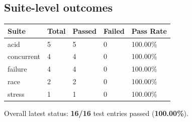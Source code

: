 \documentclass[a4paper, 11pt]{article}
\begin{document}
\subsection{Suite-level outcomes}
\renewcommand{\arraystretch}{1.3}
\begin{tabular}{|p{3.2cm}|p{2.0cm}|p{2.0cm}|p{2.0cm}|p{3.8cm}|}
\hline
\rowcolor{HeaderGray}
\textbf{Suite} & \textbf{Total} & \textbf{Passed} & \textbf{Failed} & \textbf{Pass Rate} \\ \hline
acid & 5 & 5 & 0 & 100.00\% \\ \hline
concurrent & 4 & 4 & 0 & 100.00\% \\ \hline
failure & 4 & 4 & 0 & 100.00\% \\ \hline
race & 2 & 2 & 0 & 100.00\% \\ \hline
stress & 1 & 1 & 0 & 100.00\% \\ \hline
\end{tabular}

\vspace{0.2cm}
\footnotesize Overall latest status: \textbf{16/16} test entries passed (\textbf{100.00\%}).
\normalsize
\end{document}
